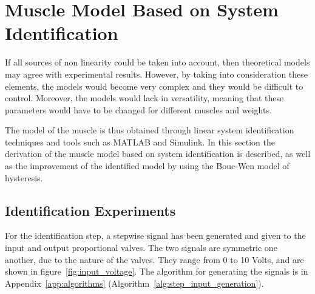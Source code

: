 %
%
%
%

\section{Muscle Model Based on System Identification}

If all sources of non linearity could be taken into account,
then theoretical models may agree with experimental results.
However, by taking into consideration these elements, the models would become
very complex and they would be difficult to control. 
Moreover, the models would lack in versatility, meaning that these parameters
would have to be changed for different muscles and weights.

The model of the muscle is thus obtained through
linear system identification techniques and tools such as MATLAB and Simulink.
In this section the derivation of the muscle model based on system identification
is described, as well as the improvement of the identified model
by using the Bouc-Wen model of hysteresis.


\subsection{Identification Experiments}
\label{sec:4.ide}

For the identification step, a stepwise signal has been generated
and given to the input and output proportional valves. The two signals are symmetric
one another, due to the nature of the valves. They range from 0 to 10 Volts,
and are shown in figure~\ref{fig:input_voltage}. The algorithm for generating the signals
is in Appendix~\ref{app:algorithms} (Algorithm~\ref{alg:step_input_generation}).

